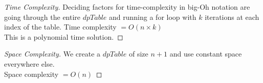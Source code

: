 \begin{solution}{4.1}
    \begin{proof}[Time Complexity]
    Deciding factors for time-complexity in big-Oh notation are going through the entire $dpTable$ and running a for loop with $k$ iterations at each index of the table.
    Time complexity $=O(n\times k)$\\
    This is a polynomial time solution.
    \end{proof}
    \begin{proof}[Space Complexity]
    We create a $dpTable$ of size $n+1$ and use constant space everywhere else.\\
    Space complexity $=O(n)$
    \end{proof}

\end{solution}